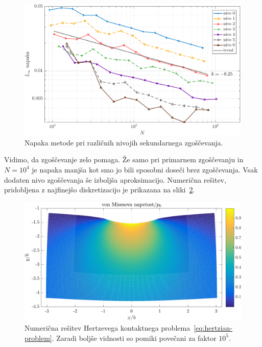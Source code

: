 \documentclass[12pt,a4paper,twoside]{article}
\theoremstyle{definition} %
\theoremstyle{plain} %
\numberwithin{equation}{section}
\newlength{\iw}
\begin{document}
\begin{figure}[h]
  \centering
  \includegraphics[width=\iw]{images/hertzian_refine_levels_convergence.pdf}
  \caption{Napaka metode pri različnih nivojih sekundarnega zgoščevanja.}
  \label{fig:hertz-refined-convergence}
\end{figure}

Vidimo, da zgoščevanje zelo pomaga. Že samo pri primarnem zgoščevanju in $N = 10^4$ je napaka manjša
kot smo jo bili sposobni doseči brez zgoščevanja. Vsak dodaten nivo zgoščevanja še izboljša
aproksimacijo. Numerična rešitev, pridobljena z najfinejšo diskretizacijo je prikazana na
sliki~\ref{fig:hertz-solution}.

\begin{figure}[!h]
  \centering
  \includegraphics[width=\iw]{images/hertzian_solution_deformed_vm.png}
  \caption[Numerična rešitev Hertzevega kontaktnega problema.]{Numerična
  rešitev Hertzevega kontaktnega problema~\eqref{eq:hertzian-problem}. Zaradi
  boljše vidnosti so pomiki povečani za faktor $10^5$.}
  \label{fig:hertz-solution}
\end{figure}
\end{document}
